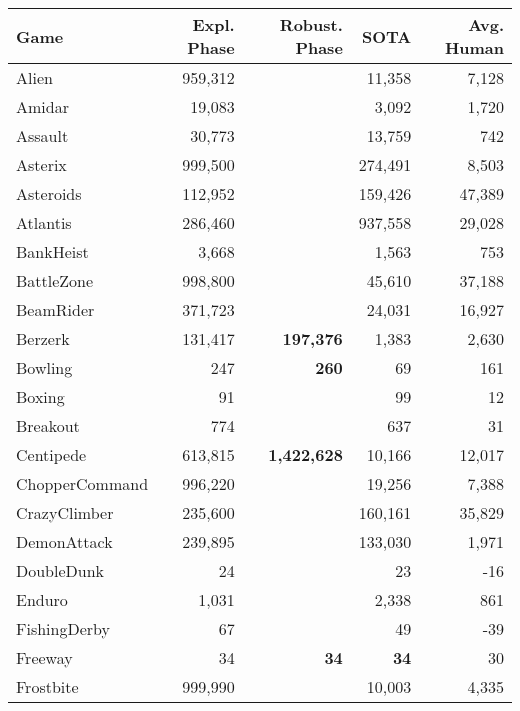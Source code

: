 \documentclass{nature}
\begin{document}
\begin{table}[ht!]
    \centering
    \fontsize{9}{10.5}\selectfont
    \begin{tabular}{l|r|rrr}
    \bf{Game} &   \bf{Expl. Phase} &     \bf{Robust. Phase} &      \bf{SOTA} & \bf{Avg. Human}\\
    \hline
Alien            & 959,312 &             &  11,358 &     7,128 \\
Amidar           &  19,083 &             &   3,092 &     1,720 \\
Assault          &  30,773 &             &  13,759 &       742 \\
Asterix          & 999,500 &             & 274,491 &     8,503 \\
Asteroids        & 112,952 &             & 159,426 &    47,389 \\
Atlantis         & 286,460 &             & 937,558 &    29,028 \\
BankHeist        &   3,668 &             &   1,563 &       753 \\
BattleZone       & 998,800 &             &  45,610 &    37,188 \\
BeamRider        & 371,723 &             &  24,031 &    16,927 \\
Berzerk          & 131,417 &     \bf{197,376} &   1,383 &     2,630 \\
Bowling          &     247 &       \bf{260} &      69 &       161 \\
Boxing           &      91 &             &      99 &        12 \\
Breakout         &     774 &             &     637 &        31 \\
Centipede        & 613,815 & \bf{1,422,628} &  10,166 &    12,017 \\
ChopperCommand   & 996,220 &             &  19,256 &     7,388 \\
CrazyClimber     & 235,600 &             & 160,161 &    35,829 \\
DemonAttack      & 239,895 &             & 133,030 &     1,971 \\
DoubleDunk       &      24 &             &      23 &       -16 \\
Enduro           &   1,031 &             &   2,338 &       861 \\
FishingDerby     &      67 &             &      49 &       -39 \\
Freeway          &      34 &        \bf{34} &      \bf{34} &        30 \\
Frostbite        & 999,990 &             &  10,003 &     4,335 \\

\end{tabular}
\end{table}
\end{document}
